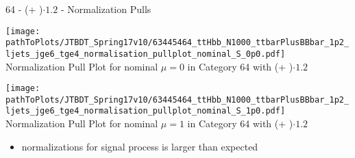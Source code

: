 \begin{frame}{64 - (\ttbar + \bbbar)$\cdot \num[round-precision=1]{1.2}$ - Normalization Pulls}

\begin{minipage}{0.4\textwidth}
\begin{center}
\texttt{[image: \\pathToPlots/JTBDT\_Spring17v10/63445464\_ttHbb\_N1000\_ttbarPlusBBbar\_1p2\_ljets\_jge6\_tge4\_normalisation\_pullplot\_nominal\_S\_0p0.pdf]}\\
Normalization Pull Plot for nominal $\mu = 0$ in Category 64 with (\ttbar + \bbbar)$\cdot \num[round-precision=1]{1.2}$
\end{center}

\end{minipage}
\hfill
\begin{minipage}{0.4\textwidth}
\begin{center}
\texttt{[image: \\pathToPlots/JTBDT\_Spring17v10/63445464\_ttHbb\_N1000\_ttbarPlusBBbar\_1p2\_ljets\_jge6\_tge4\_normalisation\_pullplot\_nominal\_S\_1p0.pdf]}\\
Normalization Pull Plot for nominal $\mu = 1$ in Category 64 with (\ttbar + \bbbar)$\cdot \num[round-precision=1]{1.2}$
\end{center}

\vskip -0.25cm


\end{minipage}

\begin{itemize}
\item normalizations for signal process is larger than expected
\end{itemize}

\end{frame}

